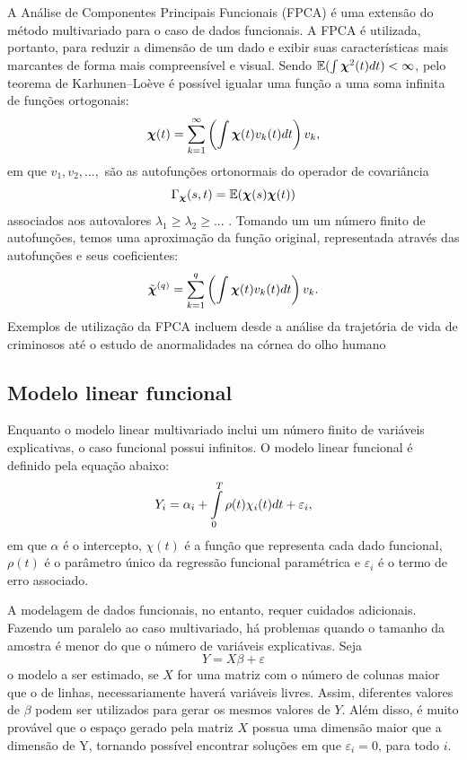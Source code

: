 \documentclass[
	12pt,				%
	openright,			%
	oneside,			%
	a4paper,			%
	english,			%
	brazil				%
	]{dissertacao-ufrgs-abntex2}
\begin{document}
A Análise de Componentes Principais Funcionais (FPCA) é uma extensão do método multivariado para o caso de dados funcionais. 
A FPCA é utilizada, portanto, para reduzir a dimensão de um dado e exibir suas
características mais marcantes de forma mais compreensível e visual. Sendo
$\mathbb{E}(\int\boldsymbol{\chi}^{2}(t)dt)<\infty$, pelo teorema de Karhunen–Loève é possível igualar uma função a uma soma infinita de funções ortogonais:
\begin{equation}
\boldsymbol{\chi}(t)=\sum_{k=1}^{\text{\ensuremath{\infty}}}\left(\int\boldsymbol{\chi}(t)v_{k}(t)dt\right)v_{k},
\end{equation}
em que $v_{1},v_{2},...,$ são as autofunções ortonormais do operador de covariância
\begin{equation}
\Gamma_{\boldsymbol{\chi}}(s,t)=\mathbb{E}(\boldsymbol{\chi}(s)\boldsymbol{\chi}(t))
\end{equation}
associados aos autovalores $\lambda_{1}\geq\lambda_{2}\geq...$ .
Tomando um um número finito de autofunções, temos uma aproximação da função original, representada através das autofunções e seus coeficientes:
\begin{equation}
\tilde{\boldsymbol{\chi}}^{(q)}=\sum_{k=1}^{\text{\ensuremath{q}}}\left(\int\boldsymbol{\chi}(t)v_{k}(t)dt\right)v_{k}.
\end{equation}
Exemplos de utilização da FPCA incluem desde a análise da trajetória de vida de criminosos \cite{ramsay_applied_2002} até o estudo de anormalidades na córnea do olho humano \cite{locantore_robust_1999}

\subsection{Modelo linear funcional}

Enquanto o modelo linear multivariado inclui um número finito de variáveis explicativas, o caso funcional possui infinitos. O modelo linear funcional é definido pela equação abaixo:
\begin{equation}
Y_{i}=\alpha_{i}+\intop_{0}^{T}\rho(t)\chi_{i}(t)dt+\varepsilon_{i},\label{eq:modelofuncionallinear}
\end{equation}
em que $\alpha$ é o intercepto, $\chi(t)$ é a função que representa
cada dado funcional, $\rho(t)$ é o parâmetro único da regressão funcional
paramétrica e $\varepsilon_{i}$ é o termo de erro associado.

A modelagem de dados funcionais, no entanto, requer cuidados adicionais. Fazendo um paralelo ao caso multivariado, há problemas quando
o tamanho da amostra é menor do que o número de variáveis explicativas.
Seja
\begin{equation}
Y=X\beta+\varepsilon
\end{equation}
o modelo a ser estimado, se $X$ for uma matriz com o número de colunas
maior que o de linhas, necessariamente haverá variáveis livres. Assim,
diferentes valores de $\beta$ podem ser utilizados para gerar os
mesmos valores de $Y$. Além disso, é muito provável que o espaço
gerado pela matriz $X$ possua uma dimensão maior que a dimensão de
Y, tornando possível encontrar soluções em que $\varepsilon_{i}=0$,
para todo $i$. 
\end{document}

